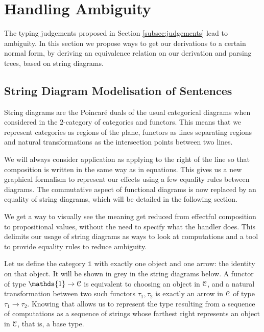 \section{Handling Ambiguity}
\label{sec:nondet}
The typing judgements proposed in Section \ref{subsec:judgements} lead to
ambiguity.
In this section we propose ways to get our derivations to a certain normal
form, by deriving an equivalence relation on our derivation and parsing trees,
based on string diagrams.

\subsection{String Diagram Modelisation of Sentences}
\label{subsec:sd}
String diagrams are the Poincaré duals of the usual categorical diagrams when
considered in the $2$-category of categories and functors.
This means that we represent categories as regions of the plane, functors as
lines separating regions and natural transformations as the intersection points
between two lines.

We will always consider application as applying to the right of the line so
that composition is written in the same way as in equations.
This gives us a new graphical formalism to represent our effects using a few
equality rules between diagrams.
The commutative aspect of functional diagrams is now replaced by an equality of
string diagrams, which will be detailed in the following section.

We get a way to visually see the meaning get reduced from effectful composition
to propositional values, without the need to specify what the handler does.
This delimits our usage of string diagrams as ways to look at computations and
a tool to provide equality rules to reduce ambiguity.

\begin{wrapfigure}{r}{.45\textwidth}
	\centering
	
\end{wrapfigure}
Let us define the category $\mathds{1}$ with exactly one object and one arrow:
the identity on that object. It will be shown in grey in the string diagrams
below.
A functor of type $\mathds{1} \to \mC$ is equivalent to choosing an object in
$\mathcal{C}$, and a natural transformation between two such functors $\tau_{1},
	\tau_{2}$ is exactly an arrow in $\mathcal{C}$ of type $\tau_{1} \to \tau_{2}$.
Knowing that allows us to represent the type resulting from a sequence of
computations as a sequence of strings whose farthest right represents an object
in $\mathcal{C}$, that is, a base type.

